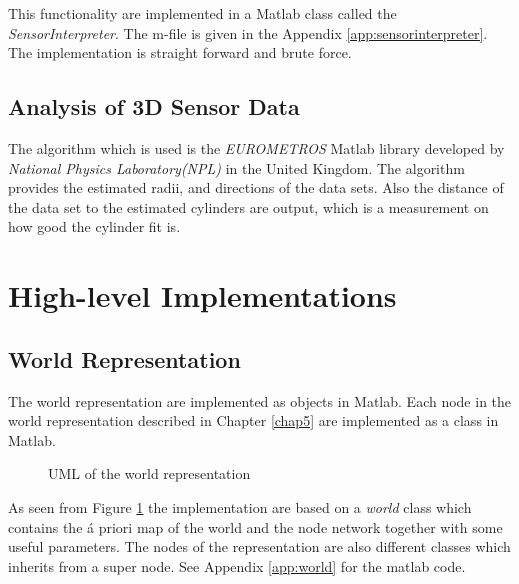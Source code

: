 This functionality are implemented in a Matlab class called the \emph{SensorInterpreter}.
The m-file is given in the Appendix \ref{app:sensorinterpreter}. The implementation is
straight forward and brute force. 


\subsection{Analysis of 3D Sensor Data}
The algorithm which is used is the \emph{EUROMETROS}\cite{eurometros} Matlab library developed by
\emph{National Physics Laboratory(NPL)} in the United Kingdom. The algorithm provides the
estimated radii, and directions of the data sets. Also the distance of the data set to the
estimated cylinders are output, which is a measurement on how good the cylinder fit is. 


\section{High-level Implementations}

\subsection{World Representation}
The world representation are implemented as objects in Matlab. Each node in the world
representation described in Chapter \ref{chap5} are implemented as a class in Matlab. 
\begin{figure}[htbp]
    \centering
    \caption{UML of the world representation}
    \label{chap6:fig-world-uml}
\end{figure}

As seen from Figure \ref{chap6:fig-world-uml} the implementation are based on a
\emph{world} class which contains the á priori map of the world and the node network
together with some useful parameters. The nodes of the representation are also different
classes which inherits from a super node. See Appendix \ref{app:world} for the matlab
code. 


